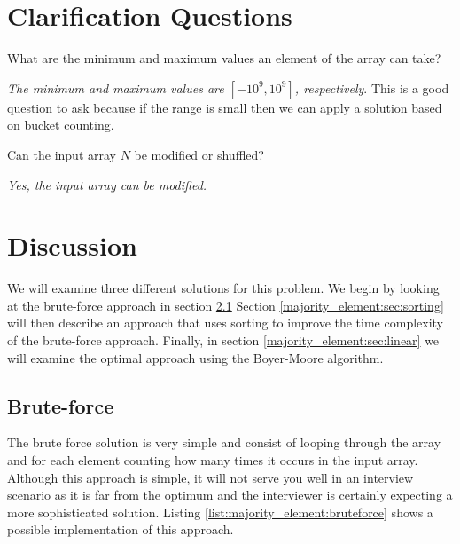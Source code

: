 \section{Clarification Questions}

\begin{QandA}
	\item \begin{questionitem} \begin{question} What are the minimum and maximum values an element of the array can take?   \end{question} 	 
    \begin{answered}
		\textit{The minimum and maximum values are $[-10^9, 10^9]$, respectively}.
		This is a good question to ask because if the range is small then we can apply a solution based on bucket counting.
	\end{answered} \end{questionitem}

	\item \begin{questionitem} \begin{question} Can the input array $N$ be modified or shuffled?   \end{question} 	 
    \begin{answered}
		\textit{Yes, the input array can be modified.}
	\end{answered} \end{questionitem}
\end{QandA}

\section{Discussion}
\label{majority_element:sec:discussion}
We will examine three different solutions for this problem. We begin  by looking at the brute-force approach in section \ref{majority_element:sec:bruteforce} Section \ref{majority_element:sec:sorting} will then describe an approach that uses sorting to improve the time complexity of the brute-force approach. Finally,  in section \ref{majority_element:sec:linear} we will examine the optimal approach using the Boyer-Moore algorithm.

\subsection{Brute-force}
\label{majority_element:sec:bruteforce}
The brute force solution is very simple and consist of looping through the array and for each element counting how many times it occurs in the input array. Although this approach is simple, it will not serve you well in an interview scenario as it is far from the optimum and the interviewer is certainly expecting a more sophisticated solution. 
Listing \ref{list:majority_element:bruteforce} shows a possible implementation of this approach. 

